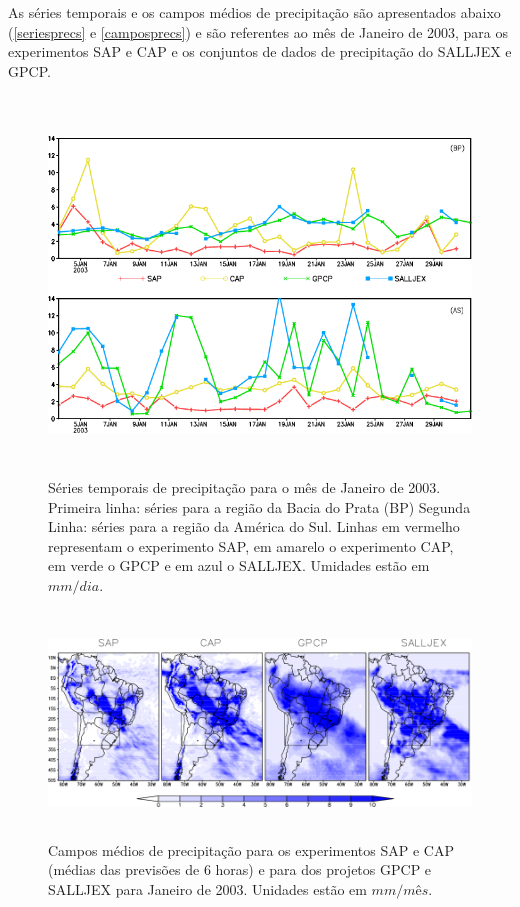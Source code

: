 As séries temporais e os campos médios de precipitação são apresentados abaixo (\autoref{seriesprecs} e \autoref{camposprecs}) e são referentes ao mês de Janeiro de 2003, para os experimentos SAP e CAP e os conjuntos de dados de precipitação do SALLJEX e GPCP.

\begin{figure}[!h]
\centering
\includegraphics[height=10cm]{./figs/series_precs.png}
\caption{Séries temporais de precipitação para o mês de Janeiro de 2003. Primeira linha: séries para a região da Bacia do Prata (BP) Segunda Linha: séries para a região da América do Sul. Linhas em vermelho representam o experimento SAP, em amarelo o experimento CAP, em verde o GPCP e em azul o SALLJEX. Umidades estão em $mm/dia$.}
\label{seriesprecs}
\end{figure}

\begin{figure}[!h]
\centering
\includegraphics[height=6cm]{./figs/campos_precs.png}
\caption{Campos médios de precipitação para os experimentos SAP e CAP (médias das previsões de 6 horas) e para dos projetos GPCP e SALLJEX para Janeiro de 2003. Unidades estão em $mm/mês$.}
\label{camposprecs}
\end{figure}

